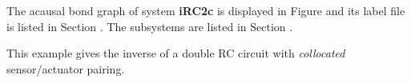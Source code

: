 

   The acausal bond graph of system \textbf{iRC2c} is
   displayed in Figure  and its label
   file is listed in Section .
   The subsystems are listed in Section .

This example gives the inverse of a double RC circuit with
\emph{collocated} sensor/actuator pairing.


